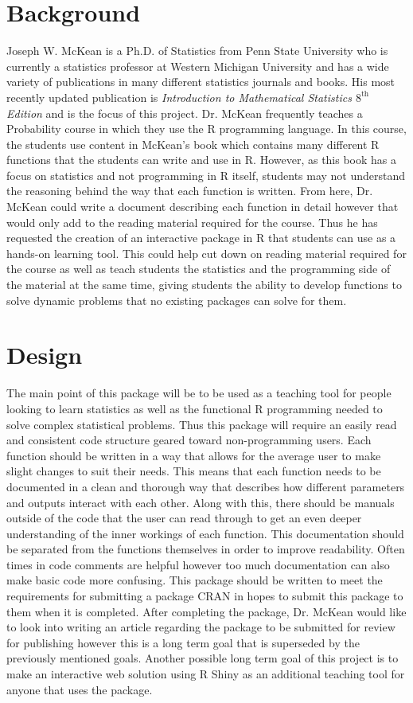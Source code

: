 \documentclass[12pt]{article}
\begin{document}
\section{Background}
Joseph W. McKean is a Ph.D. of Statistics from Penn State University who is currently a statistics professor at Western Michigan University and has a wide variety of publications in many different statistics journals and books\cite{mckean}. His most recently updated publication is \textit{Introduction to Mathematical Statistics $8^\mathrm{th}$ Edition}\cite{book} and is the focus of this project. Dr. McKean frequently teaches a Probability course in which they use the R programming language. In this course, the students use content in McKean's book which contains many different R functions that the students can write and use in R. However, as this book has a focus on statistics and not programming in R itself, students may not understand the reasoning behind the way that each function is written. From here, Dr. McKean could write a document describing each function in detail however that would only add to the reading material required for the course. Thus he has requested the creation of an interactive package in R that students can use as a hands-on learning tool. This could help cut down on reading material required for the course as well as teach students the statistics and the programming side of the material at the same time, giving students the ability to develop functions to solve dynamic problems that no existing packages can solve for them.

\section{Design}
The main point of this package will be to be used as a teaching tool for people looking to learn statistics as well as the functional R programming needed to solve complex statistical problems. Thus this package will require an easily read and consistent code structure geared toward non-programming users. Each function should be written in a way that allows for the average user to make slight changes to suit their needs. This means that each function needs to be documented in a clean and thorough way that describes how different parameters and outputs interact with each other. Along with this, there should be manuals outside of the code that the user can read through to get an even deeper understanding of the inner workings of each function. This documentation should be separated from the functions themselves in order to improve readability. Often times in code comments are helpful however too much documentation can also make basic code more confusing. This package should be written to meet the requirements for submitting a package CRAN in hopes to submit this package to them when it is completed. After completing the package, Dr. McKean would like to look into writing an article regarding the package to be submitted for review for publishing however this is a long term goal that is superseded by the previously mentioned goals. Another possible long term goal of this project is to make an interactive web solution using R Shiny as an additional teaching tool for anyone that uses the package.
\end{document}
